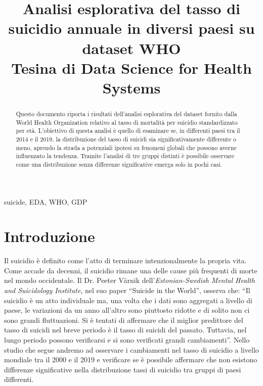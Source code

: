 \documentclass[conference]{IEEEtran}
\begin{document}
\title{Analisi esplorativa del tasso di suicidio annuale in diversi paesi su dataset WHO\\
{\footnotesize Tesina di Data Science for Health Systems}
}

\author{
}

\maketitle

\begin{abstract}
Questo documento riporta i risultati dell'analisi esplorativa del dataset fornito dalla
World Health Organization relativo al tasso di mortalità per suicidio standardizzato per età.
L'obiettivo di questa analisi è quello di esaminare se, in differenti paesi tra il 2014 e il 2019,
la distribuzione del tasso di suicidi sia significativamente differente o meno,
aprendo la strada a potenziali
ipotesi su fenomeni globali che possono averne influenzato la tendenza.
Tramite l'analisi di tre gruppi distinti è possibile osservare come una
distribuzione senza differenze significative emerga solo in pochi casi.
\end{abstract}

\begin{IEEEkeywords}
suicide, EDA, WHO, GDP
\end{IEEEkeywords}

\section{Introduzione}
Il suicidio è definito come l'atto di terminare intenzionalmente la propria vita\cite{b1}.
Come accade da decenni, il suicidio rimane una delle cause più
frequenti di morte nel mondo occidentale\cite{b2}.
Il Dr. Peeter V\"arnik dell'\emph{Estonian-Swedish Mental Health
and Suicidology Institute}, nel suo paper ``Suicide in the World''\cite{b3}, 
osserva che:
``Il suicidio è un atto individuale ma, una volta che i dati sono aggregati a
livello di paese, le variazioni da un anno all'altro sono piuttosto ridotte e
di solito non ci sono grandi fluttuazioni. Si è tentati di affermare che
il miglior predittore del tasso di suicidi nel breve periodo è il tasso di suicidi del passato.
Tuttavia, nel lungo periodo possono verificarsi e si sono verificati grandi cambiamenti''.
Nello studio che segue andremo ad osservare i cambiamenti nel tasso di suicidio 
a livello mondiale tra il 2000 e il 2019 e verificare se è possibile affermare
che non esistono differenze significative nella distribuzione tassi di suicidio
tra gruppi di paesi differenti.
\end{document}
